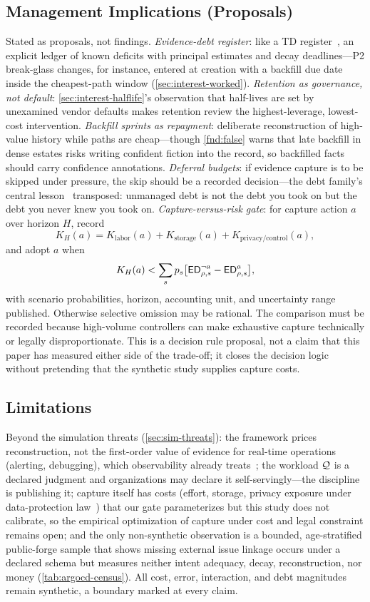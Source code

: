 \subsection{Management Implications (Proposals)}
\label{sec:disc-management}
Stated as proposals, not findings. \emph{Evidence-debt register}: like a TD
register~\cite{seaman2011,ernst2015}, an explicit ledger of known deficits with
principal estimates and decay deadlines---P2 break-glass changes, for instance,
entered at creation with a backfill due date inside the cheapest-path window
(\cref{sec:interest-worked}). \emph{Retention as governance, not default}:
\cref{sec:interest-halflife}'s observation that half-lives are set by unexamined
vendor defaults makes retention review the highest-leverage, lowest-cost
intervention. \emph{Backfill sprints as repayment}: deliberate reconstruction of
high-value history while paths are cheap---though \cref{fnd:false} warns that late
backfill in dense estates risks writing confident fiction into the record, so
backfilled facts should carry confidence annotations. \emph{Deferral budgets}:
if evidence capture is to be skipped under pressure, the skip should be a recorded
decision---the debt family's central lesson~\cite{kruchten2012} transposed: unmanaged
debt is not the debt you took on but the debt you never knew you took on.
\emph{Capture-versus-risk gate}: for capture action $a$ over horizon $H$, record
\[
K_H(a)=K_{\mathrm{labor}}(a)+K_{\mathrm{storage}}(a)
       +K_{\mathrm{privacy/control}}(a),
\]
and adopt $a$ when
\[
K_H(a)<\sum_s p_s\bigl[\mathsf{ED}_{\rho,s}^{\neg a}
                         -\mathsf{ED}_{\rho,s}^{a}\bigr],
\]
with scenario probabilities, horizon, accounting unit, and uncertainty range
published. Otherwise selective omission may be rational.
The comparison must be recorded because high-volume controllers can make exhaustive
capture technically or legally disproportionate. This is a decision rule proposal,
not a claim that this paper has measured either side of the trade-off; it closes the
decision logic without pretending that the synthetic study supplies capture costs.

\subsection{Limitations}
Beyond the simulation threats (\cref{sec:sim-threats}): the framework prices
reconstruction, not the first-order value of evidence for real-time operations
(alerting, debugging), which observability already treats~\cite{majors2022}; the
workload $\mathcal{Q}$ is a declared judgment and organizations may declare it
self-servingly---the discipline is publishing it; capture itself has costs
(effort, storage, privacy exposure under data-protection law~\cite{gdpr,
nist80092}) that our gate parameterizes but this study does not calibrate, so the
empirical optimization of capture under cost and legal constraint remains open;
and the only non-synthetic observation is a bounded, age-stratified public-forge
sample that shows missing external issue linkage occurs under a declared schema
but measures neither intent adequacy, decay, reconstruction, nor money
(\cref{tab:argocd-census}). All cost, error, interaction, and debt magnitudes remain
synthetic, a boundary marked at every claim.
